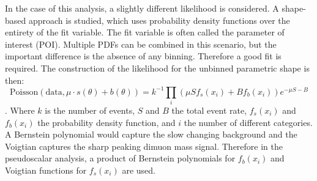 In the case of this analysis, a slightly different likelihood is considered. A shape-based approach is studied, which uses probability density functions over the entirety of the fit variable. The fit variable is often called the parameter of interest (POI). Multiple PDFs can be combined in this scenario, but the important difference is the absence of any binning. Therefore a good fit is required.  
The construction of the likelihood for the unbinned parametric shape is then:
 \begin{equation}\text{Poisson}(\text{data},\mu\cdot s(\theta)+b(\theta)) = k^{-1} \prod_i(\mu S f_s(x_i) + B f_b(x_i))e^{-\mu S - B}\end{equation}.
Where $k$ is the number of events, $S$ and $B$ the total event rate, $f_s(x_i)$ and $f_b(x_i)$ the probability density function, and $i$ the number of different categories.
A Bernstein polynomial would capture the slow changing background and the Voigtian captures the sharp peaking dimuon mass signal.
Therefore in the pseudoscalar analysis, a product of Bernstein polynomials for $f_b(x_i)$ and Voigtian functions for $f_s(x_i)$ are used.   

